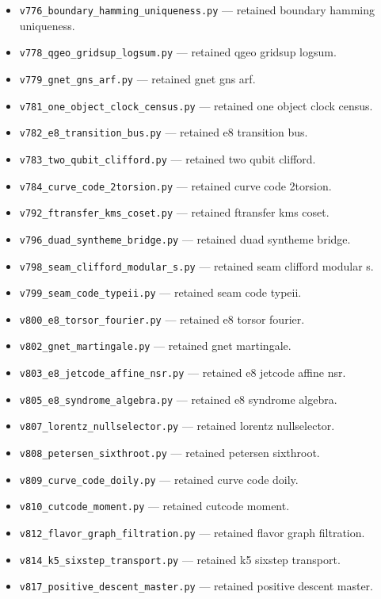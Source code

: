 \documentclass[11pt]{article}
\begin{document}
\begin{itemize}[leftmargin=2em,itemsep=1pt]
\item \texttt{v776\_boundary\_hamming\_uniqueness.py} --- retained boundary hamming uniqueness.
\item \texttt{v778\_qgeo\_gridsup\_logsum.py} --- retained qgeo gridsup logsum.
\item \texttt{v779\_gnet\_gns\_arf.py} --- retained gnet gns arf.
\item \texttt{v781\_one\_object\_clock\_census.py} --- retained one object clock census.
\item \texttt{v782\_e8\_transition\_bus.py} --- retained e8 transition bus.
\item \texttt{v783\_two\_qubit\_clifford.py} --- retained two qubit clifford.
\item \texttt{v784\_curve\_code\_2torsion.py} --- retained curve code 2torsion.
\item \texttt{v792\_ftransfer\_kms\_coset.py} --- retained ftransfer kms coset.
\item \texttt{v796\_duad\_syntheme\_bridge.py} --- retained duad syntheme bridge.
\item \texttt{v798\_seam\_clifford\_modular\_s.py} --- retained seam clifford modular s.
\item \texttt{v799\_seam\_code\_typeii.py} --- retained seam code typeii.
\item \texttt{v800\_e8\_torsor\_fourier.py} --- retained e8 torsor fourier.
\item \texttt{v802\_gnet\_martingale.py} --- retained gnet martingale.
\item \texttt{v803\_e8\_jetcode\_affine\_nsr.py} --- retained e8 jetcode affine nsr.
\item \texttt{v805\_e8\_syndrome\_algebra.py} --- retained e8 syndrome algebra.
\item \texttt{v807\_lorentz\_nullselector.py} --- retained lorentz nullselector.
\item \texttt{v808\_petersen\_sixthroot.py} --- retained petersen sixthroot.
\item \texttt{v809\_curve\_code\_doily.py} --- retained curve code doily.
\item \texttt{v810\_cutcode\_moment.py} --- retained cutcode moment.
\item \texttt{v812\_flavor\_graph\_filtration.py} --- retained flavor graph filtration.
\item \texttt{v814\_k5\_sixstep\_transport.py} --- retained k5 sixstep transport.
\item \texttt{v817\_positive\_descent\_master.py} --- retained positive descent master.

\end{itemize}
\end{document}

